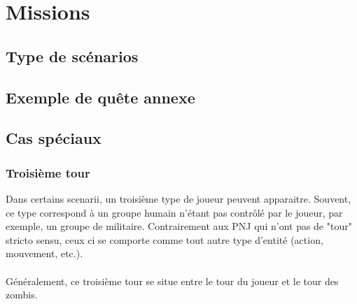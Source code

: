 \section{Missions}
\subsection{Type de scénarios}
\subsection{Exemple de quête annexe}
\subsection{Cas spéciaux}
\subsubsection{Troisième tour}
Dans certains scenarii, un troisième type de joueur peuvent apparaitre. Souvent, ce type correspond à un groupe humain n'étant pas contrôlé par le joueur, par exemple, un groupe de militaire. Contrairement aux PNJ qui n'ont pas de "tour" stricto sensu, ceux ci se comporte comme tout autre type d'entité (action, mouvement, etc.).
\\\\
Généralement, ce troisième tour se situe entre le tour du joueur et le tour des zombis.
